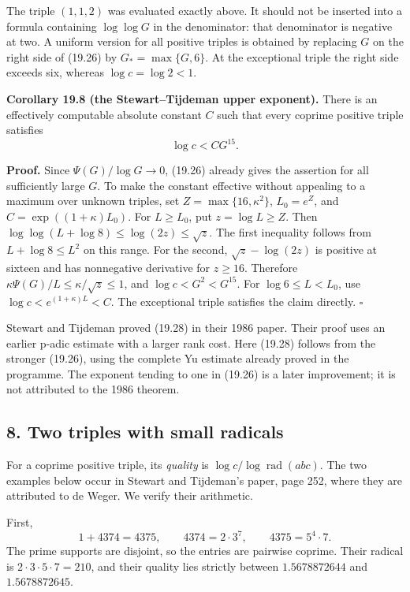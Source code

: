 \documentclass[
  11pt,
  a4paper,
]{article}
\begin{document}
The triple \((1,1,2)\) was evaluated exactly above. It should not be
inserted into a formula containing \(\log\log G\) in the denominator:
that denominator is negative at two. A uniform version for all positive
triples is obtained by replacing \(G\) on the right side of (19.26) by
\(G_* =\max\{G,6\}\). At the exceptional triple the right side exceeds
six, whereas \(\log c=\log2<1\).

\textbf{Corollary 19.8 (the Stewart--Tijdeman upper exponent).} There is
an effectively computable absolute constant \(C\) such that every
coprime positive triple satisfies \[
 \log c<CG^{15}.
 \tag{19.28}
\]

\textbf{Proof.} Since \(\Psi(G)/\log G\to0\), (19.26) already gives the
assertion for all sufficiently large \(G\). To make the constant
effective without appealing to a maximum over unknown triples, set
\(Z=\max\{16,\kappa^2\}\), \(L_0=e^Z\), and \(C=\exp((1+\kappa)L_0)\).
For \(L\ge L_0\), put \(z=\log L\ge Z\). Then
\(\log\log(L+\log8)\le\log(2z)\le\sqrt z\). The first inequality follows
from \(L+\log8\le L^2\) on this range. For the second,
\(\sqrt z-\log(2z)\) is positive at sixteen and has nonnegative
derivative for \(z\ge16\). Therefore
\(\kappa\Psi(G)/L\le\kappa/\sqrt z\le1\), and \(\log c<G^2<G^{15}\). For
\(\log6\le L<L_0\), use \(\log c<e^{(1+\kappa)L}<C\). The exceptional
triple satisfies the claim directly. \(\square\)

Stewart and Tijdeman proved (19.28) in their 1986 paper. Their proof
uses an earlier p-adic estimate with a larger rank cost. Here (19.28)
follows from the stronger (19.26), using the complete Yu estimate
already proved in the programme. The exponent tending to one in (19.26)
is a later improvement; it is not attributed to the 1986 theorem.

\subsection{8. Two triples with small
radicals}\label{two-triples-with-small-radicals}

For a coprime positive triple, its \emph{quality} is
\(\log c/\log\operatorname{rad}(abc)\). The two examples below occur in
Stewart and Tijdeman's paper, page 252, where they are attributed to de
Weger. We verify their arithmetic.

First, \[
 1+4374=4375,\qquad
 4374=2\cdot3^7,\qquad4375=5^4\cdot7.
 \tag{19.29}
\] The prime supports are disjoint, so the entries are pairwise coprime.
Their radical is \(2\cdot3\cdot5\cdot7=210\), and their quality lies
strictly between \(1.5678872644\) and \(1.5678872645\).
\end{document}
